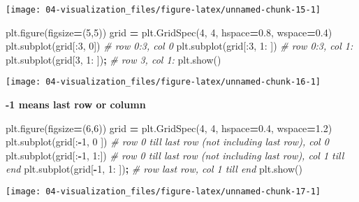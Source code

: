 \documentclass[
]{book}
\newenvironment{Shaded}{\begin{snugshade}}{\end{snugshade}}
\newcommand{\CommentTok}[1]{\textcolor[rgb]{0.37,0.37,0.37}{\textit{#1}}}
\newcommand{\DecValTok}[1]{\textcolor[rgb]{0.06,0.06,0.06}{#1}}
\newcommand{\FloatTok}[1]{\textcolor[rgb]{0.06,0.06,0.06}{#1}}
\newcommand{\NormalTok}[1]{#1}
\newcommand{\OperatorTok}[1]{\textcolor[rgb]{0.43,0.43,0.43}{\textbf{#1}}}
\begin{document}
\texttt{[image: 04-visualization\_files/figure-latex/unnamed-chunk-15-1]}

\begin{Shaded}
\begin{Highlighting}[]
\NormalTok{plt.figure(figsize}\OperatorTok{=}\NormalTok{(}\DecValTok{5}\NormalTok{,}\DecValTok{5}\NormalTok{))}
\NormalTok{grid }\OperatorTok{=}\NormalTok{ plt.GridSpec(}\DecValTok{4}\NormalTok{, }\DecValTok{4}\NormalTok{, hspace}\OperatorTok{=}\FloatTok{0.8}\NormalTok{, wspace}\OperatorTok{=}\FloatTok{0.4}\NormalTok{)}
\NormalTok{plt.subplot(grid[:}\DecValTok{3}\NormalTok{, }\DecValTok{0}\NormalTok{])    }\CommentTok{\# row 0:3, col 0}
\NormalTok{plt.subplot(grid[:}\DecValTok{3}\NormalTok{, }\DecValTok{1}\NormalTok{: ])  }\CommentTok{\# row 0:3, col 1:}
\NormalTok{plt.subplot(grid[}\DecValTok{3}\NormalTok{, }\DecValTok{1}\NormalTok{: ])}\OperatorTok{;}  \CommentTok{\# row 3,   col 1:}
\NormalTok{plt.show()}
\end{Highlighting}
\end{Shaded}

\texttt{[image: 04-visualization\_files/figure-latex/unnamed-chunk-16-1]}

\textbf{-1 means last row or column}

\begin{Shaded}
\begin{Highlighting}[]
\NormalTok{plt.figure(figsize}\OperatorTok{=}\NormalTok{(}\DecValTok{6}\NormalTok{,}\DecValTok{6}\NormalTok{))}
\NormalTok{grid }\OperatorTok{=}\NormalTok{ plt.GridSpec(}\DecValTok{4}\NormalTok{, }\DecValTok{4}\NormalTok{, hspace}\OperatorTok{=}\FloatTok{0.4}\NormalTok{, wspace}\OperatorTok{=}\FloatTok{1.2}\NormalTok{)}
\NormalTok{plt.subplot(grid[:}\OperatorTok{{-}}\DecValTok{1}\NormalTok{, }\DecValTok{0}\NormalTok{ ])  }\CommentTok{\# row 0 till last row (not including last row), col 0}
\NormalTok{plt.subplot(grid[:}\OperatorTok{{-}}\DecValTok{1}\NormalTok{, }\DecValTok{1}\NormalTok{:])  }\CommentTok{\# row 0 till last row (not including last row), col 1 till end}
\NormalTok{plt.subplot(grid[}\OperatorTok{{-}}\DecValTok{1}\NormalTok{, }\DecValTok{1}\NormalTok{: ])}\OperatorTok{;} \CommentTok{\# row last row, col 1 till end}
\NormalTok{plt.show()}
\end{Highlighting}
\end{Shaded}

\texttt{[image: 04-visualization\_files/figure-latex/unnamed-chunk-17-1]}
\end{document}
